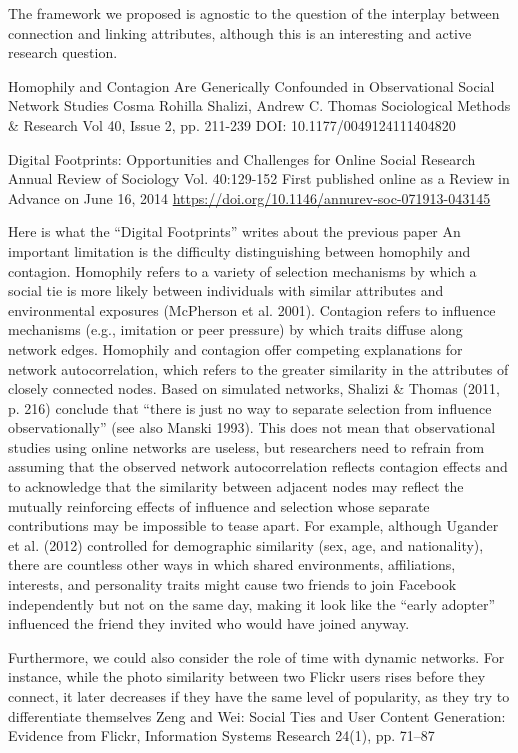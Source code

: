 The framework we proposed is agnostic to the question of the interplay between connection and
linking attributes, although this is an interesting and active research question.

Homophily and Contagion Are Generically Confounded in Observational Social Network Studies
Cosma Rohilla Shalizi, Andrew C. Thomas
Sociological Methods \& Research
Vol 40, Issue 2, pp. 211-239
DOI: 10.1177/0049124111404820

Digital Footprints: Opportunities and Challenges for Online Social Research
Annual Review of Sociology
Vol. 40:129-152 
First published online as a Review in Advance on June 16, 2014
\url{https://doi.org/10.1146/annurev-soc-071913-043145}

Here is what the “Digital Footprints” writes about the previous paper
An important limitation is the difficulty distinguishing between homophily and contagion. Homophily
refers to a variety of selection mechanisms by which a social tie is more likely between individuals
with similar attributes and environmental exposures (McPherson et al.  2001). Contagion refers to
influence mechanisms (e.g., imitation or peer pressure) by which traits diffuse along network edges.
Homophily and contagion offer competing explanations for network autocorrelation, which refers to
the greater similarity in the attributes of closely connected nodes. Based on simulated networks,
Shalizi \& Thomas (2011, p. 216) conclude that “there is just no way to separate selection from
influence observationally” (see also Manski 1993). This does not mean that observational studies
using online networks are useless, but researchers need to refrain from assuming that the observed
network autocorrelation reflects contagion effects and to acknowledge that the similarity between
adjacent nodes may reflect the mutually reinforcing effects of influence and selection whose
separate contributions may be impossible to tease apart.  For example, although Ugander et al.
(2012) controlled for demographic similarity (sex, age, and nationality), there are countless other
ways in which shared environments, affiliations, interests, and personality traits might cause two
friends to join Facebook independently but not on the same day, making it look like the “early
adopter” influenced the friend they invited who would have joined anyway.

Furthermore, we could also consider the role of time with dynamic networks. For instance, while the
photo similarity between two Flickr users rises before they connect, it later decreases if they have
the same level of popularity, as they try to differentiate themselves
Zeng and Wei: Social Ties and User Content Generation: Evidence from Flickr, Information Systems
Research 24(1), pp. 71–87
